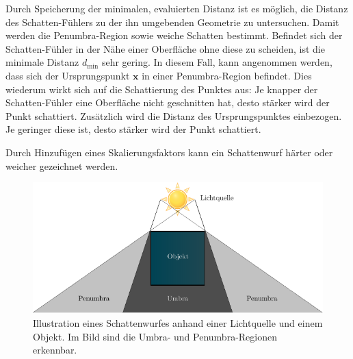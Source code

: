 Durch Speicherung der minimalen, evaluierten Distanz ist es möglich, die
Distanz des Schatten-Fühlers zu der ihn umgebenden Geometrie zu
untersuchen. Damit werden die Penumbra-Region sowie weiche Schatten
bestimmt. Befindet sich der Schatten-Fühler in der Nähe einer
Oberfläche ohne diese zu scheiden, ist die minimale Distanz
$d_{\text{min}}$ sehr gering. In diesem Fall, kann angenommen
werden, dass sich der Ursprungspunkt $\bm{x}$ in einer Penumbra-Region
befindet. Dies wiederum wirkt sich auf die Schattierung des Punktes aus: Je
knapper der Schatten-Fühler eine Oberfläche nicht geschnitten hat, desto
stärker wird der Punkt schattiert. Zusätzlich wird die Distanz des
Ursprungspunktes einbezogen. Je geringer diese ist, desto stärker wird
der Punkt schattiert.

Durch Hinzufügen eines Skalierungsfaktors kann ein Schattenwurf härter
oder weicher gezeichnet werden.

\begin{figure}[H]
    \centering
    \includegraphics{img/shadowing.pdf}
    \caption{Illustration eines Schattenwurfes anhand einer Lichtquelle
        und einem Objekt. Im Bild sind die Umbra- und Penumbra-Regionen
        erkennbar.\protect\footnotemark}\label{fig:shadowing}
\end{figure}

